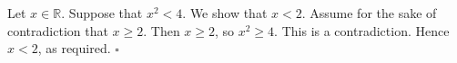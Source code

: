 Let $x \in \mathbb{R}$.
Suppose that $x^{2} < 4$.
We show that $x < 2$.
Assume for the sake of contradiction that $x \geq 2$.
Then $x \geq 2$, so $x^{2} \geq 4$.
This is a contradiction.
Hence $x < 2$, as required. \hfill$\square$
